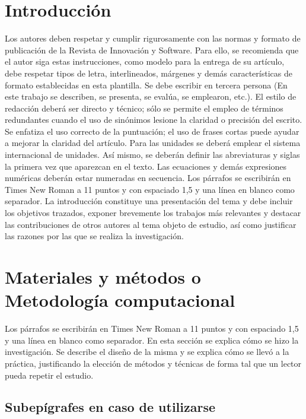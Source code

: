 \documentclass{innosoft}
\begin{document}
\onehalfspacing
\parskip=12pt
\section*{Introducci\'on}
Los autores deben respetar y cumplir rigurosamente con las normas y formato de publicaci\'on de la Revista de Innovaci\'on y Software. Para ello, se recomienda que el autor siga estas instrucciones, como modelo para la entrega de su art\'iculo, debe respetar tipos de letra, interlineados, m\'argenes y dem\'as caracter\'isticas de formato establecidas en esta plantilla. Se debe escribir en tercera persona (En este trabajo se describen, se presenta, se eval\'ua, se emplearon, etc.).
El estilo de redacci\'on deber\'a ser directo y t\'ecnico; s\'olo se permite el empleo de t\'erminos redundantes cuando el uso de sin\'onimos lesione la claridad o precisi\'on del escrito. Se enfatiza el uso correcto de la puntuaci\'on; el uso de frases cortas puede ayudar a mejorar la claridad del art\'iculo. Para las unidades se deber\'a emplear el sistema internacional de unidades. As\'i mismo, se deber\'an definir las abreviaturas y siglas la primera vez que aparezcan en el texto. Las ecuaciones y dem\'as expresiones num\'ericas deber\'an estar numeradas en secuencia.
Los p\'arrafos se escribir\'an en Times New Roman a 11 puntos y con espaciado 1,5 y una l\'inea en blanco como separador.
La introducci\'on constituye una presentaci\'on del tema y debe incluir los objetivos trazados, exponer brevemente los trabajos m\'as relevantes y destacar las contribuciones de otros autores al tema objeto de estudio, as\'i como justificar las razones por las que se realiza la investigaci\'on. 


\section*{Materiales y m\'etodos o Metodolog\'ia computacional}\label{metodos}

Los p\'arrafos se escribir\'an en Times New Roman a 11 puntos y con espaciado 1,5 y una l\'inea en blanco como separador. En esta secci\'on se explica c\'omo se hizo la investigaci\'on. Se describe el dise\~no de la misma y se explica c\'omo se llev\'o a la pr\'actica, justificando la elecci\'on de m\'etodos y t\'ecnicas de forma tal que un lector pueda repetir el estudio.

\subsection*{Subep\'igrafes en caso de utilizarse}
\end{document}
